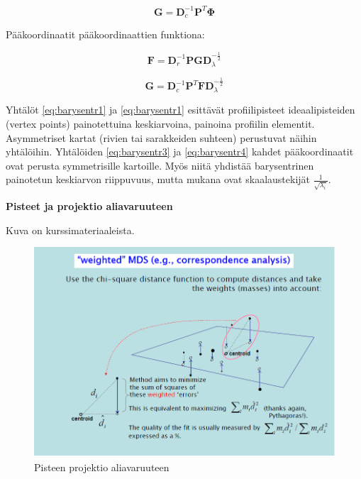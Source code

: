 \documentclass[
  finnish,
]{book}
\begin{document}
\begin{equation}
\boldsymbol{G} = \boldsymbol{D}_{c}^{-1} \boldsymbol{P}^{T}\boldsymbol{\Phi}
\label{eq:barysentr2}
\end{equation}

Pääkoordinaatit pääkoordinaattien funktiona:

\begin{equation}
\boldsymbol{F} = \boldsymbol{D}_{r}^{-1} \boldsymbol{P}\boldsymbol{G}\boldsymbol{D}_{\lambda}^{-\frac{1}{2}}
\label{eq:barysentr3}
\end{equation}

\begin{equation}
\boldsymbol{G} = \boldsymbol{D}_{c}^{-1} \boldsymbol{P}^{T}\boldsymbol{F}\boldsymbol{D}_{\lambda}^{-\frac{1}{2}}
\label{eq:barysentr4}
\end{equation}

Yhtälöt \eqref{eq:barysentr1} ja \eqref{eq:barysentr1} esittävät profiilipisteet ideaalipisteiden (vertex points)
painotettuina keskiarvoina, painoina profiilin elementit. Asymmetriset kartat
(rivien tai sarakkeiden suhteen) perustuvat näihin yhtälöihin. Yhtälöiden \eqref{eq:barysentr3}
ja \eqref{eq:barysentr4} kahdet pääkoordinaatit ovat perusta symmetrisille kartoille. Myös niitä
yhdistää barysentrinen painotetun keskiarvon riippuvuus, mutta mukana ovat skaalaustekijät
\(\frac{1}{\sqrt{\lambda_{i}}}\).

\textbf{Pisteet ja projektio aliavaruuteen}

Kuva on kurssimateriaaleista\citep{RefWorks:doc:5b6ef091e4b0984fd9b8c0ca}.

\begin{figure}

{\centering \includegraphics[width=0.7\linewidth]{img/CAquality} 

}

\caption{Pisteen projektio aliavaruuteen}\label{fig:projectionimg1}
\end{figure}
\end{document}

